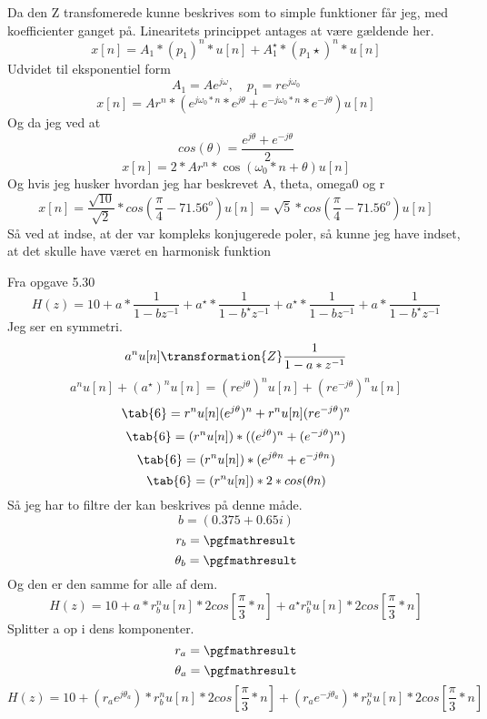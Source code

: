 \begin{Udledninger}
\begin{underrubrik}
        Da den Z transfomerede kunne beskrives som to simple funktioner får jeg, med koefficienter ganget på. 
        Linearitets princippet antages at være gældende her. 
        \[x[n] = A_1*(p_1)^n*u[n] + A_1^\star * (p_1\star)^n*u[n]\]
        Udvidet til eksponentiel form \[A_1 = Ae^{j\omega}, \quad p_1 = re^{j\omega_0}\]
        \[x[n] = Ar^n * (e^{j\omega_0*n} * e^{j\theta} + e^{-j\omega_0*n} * e^{-j\theta})u[n]\]
        Og da jeg ved at 
        \[cos(\theta) = \frac{e^{j\theta} + e^{-j\theta}}{2}\]
        \[x[n] = 2 * Ar^n * \cos(\omega_0 * n + \theta)u[n]\]
        Og hvis jeg husker hvordan jeg har beskrevet A, theta, omega0 og r
        \[x[n] = \frac{\sqrt{10}}{\sqrt{2}} * cos(\frac{\pi}{4} -71.56^o)u[n] = \sqrt{5} * cos(\frac{\pi}{4} -71.56^o)u[n]\]
        Så ved at indse, at der var kompleks konjugerede poler, så kunne jeg have indset, at det skulle have været en harmonisk funktion
    \end{underrubrik}
    \begin{underrubrik}
        Fra opgave 5.30
        \[H(z) = 10 + a * \frac{1}{1 - bz^{-1}} + a^\star * \frac{1}{1 - b^\star z^{-1}} + a^\star * \frac{1}{1 - bz^{-1}} + a * \frac{1}{1 - b^\star z^{-1}}\]
        Jeg ser en symmetri. 
        \[a^nu[n] \transformation{Z} \frac{1}{1 - a*z^{-1}}\]
        \[a^nu[n] + (a^\star)^nu[n] = (re^{j\theta})^nu[n] + (re^{-j\theta})^nu[n]\]
        \[\tab{6}                   = r^nu[n](e^{j\theta})^n + r^nu[n](re^{-j\theta})^n\]
        \[\tab{6}                   = (r^nu[n])*((e^{j\theta})^n + (e^{-j\theta})^n)\]
        \[\tab{6}                   = (r^nu[n])*(e^{j\theta n} + e^{-j\theta n})\]
        \[\tab{6}                   = (r^nu[n])* 2 * cos(\theta n)\]
        Så jeg har to filtre der kan beskrives på denne måde. 
        \[b = (0.375 + 0.65i)\]
         \edef\radius{\pgfmathresult}
         \edef\vinkel{\pgfmathresult}
        \[r_b = \radius\]
        \[\theta_b = \vinkel\] 
        Og den er den samme for alle af dem. 
        \[H(z) = 10 + a * r_b^nu[n] * 2cos[\frac{\pi}{3} * n] + a^\star r_b^nu[n] * 2cos[\frac{\pi}{3} * n]\]
        Splitter a op i dens komponenter. 
         \edef\radius{\pgfmathresult}
         \edef\vinkel{\pgfmathresult} %
        \[r_a = \radius\]
        \[\theta_a = \vinkel\] 
        \[H(z) = 10 + (r_a e^{j\theta_a}) * r_b^nu[n] * 2cos[\frac{\pi}{3} * n] + (r_a e^{-j\theta_a}) * r_b^nu[n] * 2cos[\frac{\pi}{3} * n]\]

\end{underrubrik}
\end{Udledninger}
